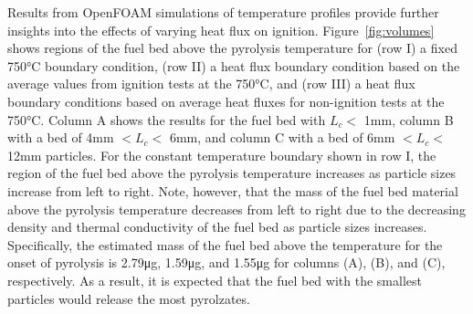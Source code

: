     Results from OpenFOAM simulations of temperature profiles provide further insights into the effects of varying heat flux on ignition. Figure~\ref{fig:volumes} shows regions of the fuel bed above the pyrolysis temperature for (row I) a fixed 750\si{\celsius} boundary condition, (row II) a heat flux boundary condition based on the average values from ignition tests at the 750\si{\celsius}, and (row III) a heat flux boundary conditions based on  average heat fluxes for non-ignition tests at the 750\si{\celsius}. Column A shows the results for the fuel bed with $L_{c}<$ 1mm, column B with a bed of 4mm $<L_{c}<$ 6mm, and column C with a bed of 6\si{\milli\meter} $<L_{c}<$ 12\si{\milli\meter} particles. For the constant temperature boundary shown in row I, the region of the fuel bed above the pyrolysis temperature increases as particle sizes increase from left to right. Note, however, that the mass of the fuel bed material above the pyrolysis temperature decreases from left to right due to the decreasing density and thermal conductivity of the fuel bed as particle sizes increases. Specifically, the estimated mass of the fuel bed above the temperature for the onset of pyrolysis is 2.79\si{\micro\gram}, 1.59\si{\micro\gram}, and 1.55\si{\micro\gram} for columns (A), (B), and (C), respectively.  As a result, it is expected that the fuel bed with the smallest particles would release the most pyrolzates. 
    
